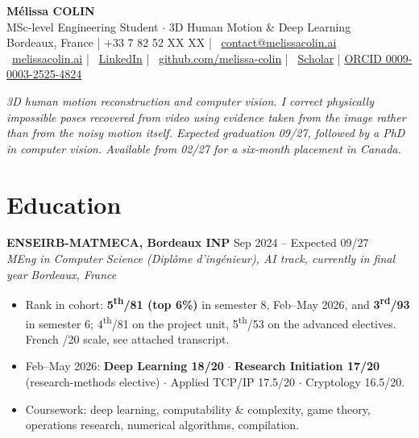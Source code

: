 \documentclass[10pt, letterpaper]{article}
\newcommand{\entry}[4]{%
  \noindent \textbf{#1} \hfill #2 \\
  \textit{#3} \hfill \textit{#4} \par
}
\providecommand{\myphone}{+33 7 82 52 XX XX}
\begin{document}
\begin{center}
    {\fontsize{21}{21}\selectfont \textbf{Mélissa COLIN}} \\[4pt]
    {\large MSc-level Engineering Student $\cdot$ 3D Human Motion \& Deep Learning} \\[4pt]

    \small{
    \faMapMarker* Bordeaux, France \quad|\quad
    \faPhone* \myphone{} \quad|\quad
    \faEnvelope~\href{mailto:contact@melissacolin.ai}{contact@melissacolin.ai} \\
    \faGlobe~\href{https://melissacolin.ai}{melissacolin.ai} \quad|\quad
    \faLinkedin~\href{https://www.linkedin.com/in/m\%C3\%A9lissa-colin/}{LinkedIn} \quad|\quad
    \faGithub~\href{https://github.com/melissa-colin}{github.com/melissa-colin} \quad|\quad
    \faGraduationCap~\href{https://scholar.google.com/citations?user=7r7iFpsAAAAJ}{Scholar} \quad|\quad
    \href{https://orcid.org/0009-0003-2525-4824}{ORCID 0009-0003-2525-4824}
    }
\end{center}

\vspace{2pt}

{\small \textit{3D human motion reconstruction and computer vision. I correct physically
impossible poses recovered from video using evidence taken from the image rather than from
the noisy motion itself. Expected graduation 09/27, followed by a PhD in computer vision.
Available from 02/27 for a six-month placement in Canada.}}

\section{Education}

\entry{ENSEIRB-MATMECA, Bordeaux INP}{Sep 2024 -- Expected 09/27}%
{MEng in Computer Science (\textit{Diplôme d'ingénieur}), AI track, currently in final year}{Bordeaux, France}
\begin{itemize}
    \item Rank in cohort: \textbf{5\textsuperscript{th}/81 (top 6\%)} in semester 8, Feb--May 2026, and \textbf{3\textsuperscript{rd}/93} in semester 6; 4\textsuperscript{th}/81 on the project unit, 5\textsuperscript{th}/53 on the advanced electives. French /20 scale, see attached transcript.
    \item Feb--May 2026: \textbf{Deep Learning 18/20} $\cdot$ \textbf{Research Initiation 17/20} (research-methods elective) $\cdot$ Applied TCP/IP 17.5/20 $\cdot$ Cryptology 16.5/20.
    \item Coursework: deep learning, computability \& complexity, game theory, operations research, numerical algorithms, compilation.
\end{itemize}
\end{document}
